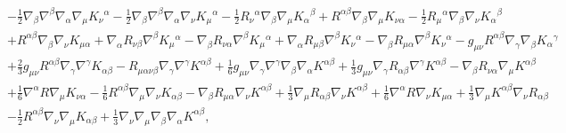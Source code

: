 \documentclass[aps]{revtex4}
\begin{document}
\begin{eqnarray}
&&-  \tfrac{1}{2} \nabla_{\beta}\nabla^{\beta}\nabla_{\alpha}\nabla_{\mu}K_{\nu}{}^{\alpha} 
-  \tfrac{1}{2} \nabla_{\beta}\nabla^{\beta}\nabla_{\alpha}\nabla_{\nu}K_{\mu}{}^{\alpha} -  \tfrac{1}{2} R_{\nu}{}^{\alpha} \nabla_{\beta}\nabla_{\mu}K_{\alpha}{}^{\beta} + R^{\alpha \beta} \nabla_{\beta}\nabla_{\mu}K_{\nu \alpha} -  \tfrac{1}{2} R_{\mu}{}^{\alpha} \nabla_{\beta}\nabla_{\nu}K_{\alpha}{}^{\beta} 
\nonumber\\
&&+ R^{\alpha \beta} \nabla_{\beta}\nabla_{\nu}K_{\mu \alpha} 
+ \nabla_{\alpha}R_{\nu \beta} \nabla^{\beta}K_{\mu}{}^{\alpha} 
-  \nabla_{\beta}R_{\nu \alpha} \nabla^{\beta}K_{\mu}{}^{\alpha} + \nabla_{\alpha}R_{\mu \beta} \nabla^{\beta}K_{\nu}{}^{\alpha} -  \nabla_{\beta}R_{\mu \alpha} \nabla^{\beta}K_{\nu}{}^{\alpha} -  g_{\mu \nu} R^{\alpha \beta} \nabla_{\gamma}\nabla_{\beta}K_{\alpha}{}^{\gamma} 
\nonumber\\
&&+ \tfrac{2}{3} g_{\mu \nu} R^{\alpha \beta} \nabla_{\gamma}\nabla^{\gamma}K_{\alpha \beta} 
-  R_{\mu \alpha \nu \beta} \nabla_{\gamma}\nabla^{\gamma}K^{\alpha \beta} + \tfrac{1}{6} g_{\mu \nu} \nabla_{\gamma}\nabla^{\gamma}\nabla_{\beta}\nabla_{\alpha}K^{\alpha \beta} + \tfrac{1}{3} g_{\mu \nu} \nabla_{\gamma}R_{\alpha \beta} \nabla^{\gamma}K^{\alpha \beta} -  \nabla_{\beta}R_{\nu \alpha} \nabla_{\mu}K^{\alpha \beta} 
\nonumber\\
&&+ \tfrac{1}{6} \nabla^{\alpha}R \nabla_{\mu}K_{\nu \alpha} 
-  \tfrac{1}{6} R^{\alpha \beta} \nabla_{\mu}\nabla_{\nu}K_{\alpha \beta} -  \nabla_{\beta}R_{\mu \alpha} \nabla_{\nu}K^{\alpha \beta} + \tfrac{1}{3} \nabla_{\mu}R_{\alpha \beta} \nabla_{\nu}K^{\alpha \beta} + \tfrac{1}{6} \nabla^{\alpha}R \nabla_{\nu}K_{\mu \alpha} + \tfrac{1}{3} \nabla_{\mu}K^{\alpha \beta} \nabla_{\nu}R_{\alpha \beta} 
\nonumber\\
&&-  \tfrac{1}{2} R^{\alpha \beta} \nabla_{\nu}\nabla_{\mu}K_{\alpha \beta}+ \tfrac{1}{3} \nabla_{\nu}\nabla_{\mu}\nabla_{\beta}\nabla_{\alpha}K^{\alpha \beta},
\label{AP44}
\end{eqnarray}
%
%
\end{document}
